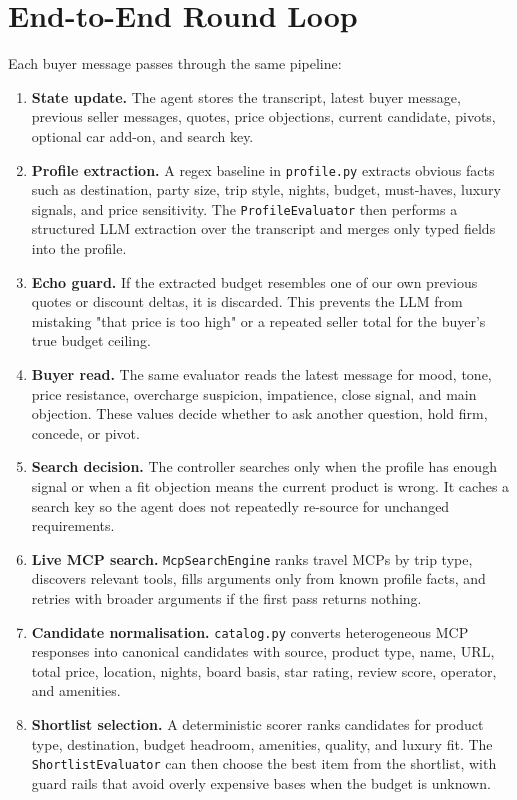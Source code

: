 \documentclass[10pt,a4paper]{article}
\begin{document}
\section*{End-to-End Round Loop}
Each buyer message passes through the same pipeline:

\begin{enumerate}
  \item \textbf{State update.} The agent stores the transcript, latest buyer message, previous seller messages, quotes, price objections, current candidate, pivots, optional car add-on, and search key.
  \item \textbf{Profile extraction.} A regex baseline in \texttt{profile.py} extracts obvious facts such as destination, party size, trip style, nights, budget, must-haves, luxury signals, and price sensitivity. The \texttt{ProfileEvaluator} then performs a structured LLM extraction over the transcript and merges only typed fields into the profile.
  \item \textbf{Echo guard.} If the extracted budget resembles one of our own previous quotes or discount deltas, it is discarded. This prevents the LLM from mistaking "that price is too high" or a repeated seller total for the buyer's true budget ceiling.
  \item \textbf{Buyer read.} The same evaluator reads the latest message for mood, tone, price resistance, overcharge suspicion, impatience, close signal, and main objection. These values decide whether to ask another question, hold firm, concede, or pivot.
  \item \textbf{Search decision.} The controller searches only when the profile has enough signal or when a fit objection means the current product is wrong. It caches a search key so the agent does not repeatedly re-source for unchanged requirements.
  \item \textbf{Live MCP search.} \texttt{McpSearchEngine} ranks travel MCPs by trip type, discovers relevant tools, fills arguments only from known profile facts, and retries with broader arguments if the first pass returns nothing.
  \item \textbf{Candidate normalisation.} \texttt{catalog.py} converts heterogeneous MCP responses into canonical candidates with source, product type, name, URL, total price, location, nights, board basis, star rating, review score, operator, and amenities.
  \item \textbf{Shortlist selection.} A deterministic scorer ranks candidates for product type, destination, budget headroom, amenities, quality, and luxury fit. The \texttt{ShortlistEvaluator} can then choose the best item from the shortlist, with guard rails that avoid overly expensive bases when the budget is unknown.

\end{enumerate}
\end{document}
